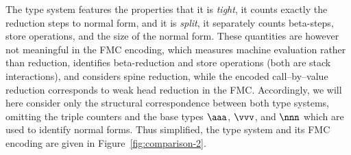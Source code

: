 \documentclass[a4paper,UKenglish,cleveref, autoref, thm-restate]{lipics-v2021}
\newcommand\tim{\kern1pt{\smallbin\times}\kern1pt}
\newcommand\then{\kern1pt{\smallbin\gg}\kern1pt}
\begin{document}

The type system features the properties that it is \emph{tight}, it counts exactly the reduction steps to normal form, and it is \emph{split}, it separately counts beta-steps, store operations, and the size of the normal form. These quantities are however not meaningful in the FMC encoding, which measures machine evaluation rather than reduction, identifies beta-reduction and store operations (both are stack interactions), and considers spine reduction, while the encoded call--by--value reduction corresponds to weak head reduction in the FMC. Accordingly, we will here consider only the structural correspondence between both type systems, omitting the triple counters and the base types $\aaa$, $\vvv$, and $\nnn$ which are used to identify normal forms. Thus simplified, the type system and its FMC encoding are given in Figure~\ref{fig:comparison-2}.
\end{document}
